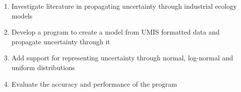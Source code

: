 \documentclass[ %
                    author={Tom Jager},
                supervisor={Dr. Daniel Schien},
                    degree={MEng},
                     title={A Bayesian Inference Engine for UMIS Structured Data},
                  subtitle={},
                      type={research},
                      year={2019} ]{dissertation}
\begin{document}
\begin{enumerate}
    \item Investigate literature in propagating uncertainty through industrial ecology models
    \item Develop a program to create a model from UMIS formatted data and propagate uncertainty through it
    \item Add support for representing uncertainty through normal, log-normal and uniform distributions
    \item Evaluate the accuracy and performance of the program
\end{enumerate}

\end{document}

